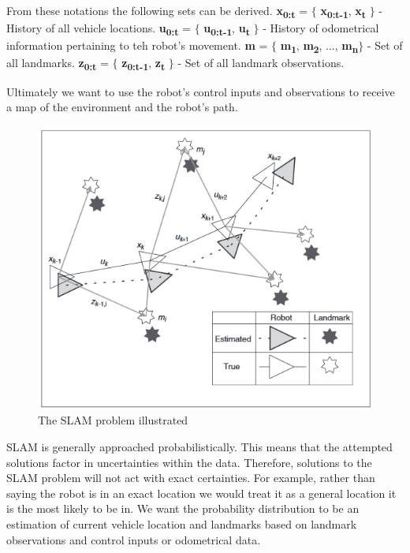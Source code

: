 			From these notations the following sets can be derived. \newline
			\textbf{x\textsubscript{0:t}} = $\lbrace$ \textbf{x\textsubscript{0:t-1}}, \textbf{x\textsubscript{t}} $\rbrace$ - History of all vehicle locations. \newline
			\textbf{u\textsubscript{0:t}} = $\lbrace$ \textbf{u\textsubscript{0:t-1}}, \textbf{u\textsubscript{t}} $\rbrace$ - History of odometrical information pertaining to teh robot's movement. \newline
			\textbf{m} = $\lbrace$ \textbf{m\textsubscript{1}}, \textbf{m\textsubscript{2}}, ..., \textbf{m\textsubscript{n}}$\rbrace$ - Set of all landmarks. \newline
			\textbf{z\textsubscript{0:t}} = $\lbrace$ \textbf{z\textsubscript{0:t-1}}, \textbf{z\textsubscript{t}} $\rbrace$ - Set of all landmark observations. \newline
			
			Ultimately we want to use the robot's control inputs and observations to receive a map of the environment and the robot's path.
			
			\begin{figure}[h]
				\includegraphics[scale=0.65]{ANALYSIS/slamdiagram.png}
				\caption{The SLAM problem illustrated \citep{durrant2006simultaneous}}
				\label{fig:slamillustration}
			\end{figure}
			
			SLAM is generally approached probabilistically. This means that the attempted solutions factor in uncertainties within the data. Therefore, solutions to the SLAM problem will not act with exact certainties. For example, rather than saying the robot is in an exact location we would treat it as a general location it is the most likely to be in. We want the probability distribution to be an estimation of current vehicle location and landmarks based on landmark observations and control inputs or odometrical data. 
			

